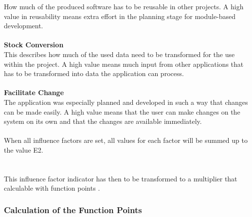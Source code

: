 How much of the produced software has to be reusable in other projects. A high value in reusability means extra effort in the planning stage for module-based development.\\
\\
\textbf{Stock Conversion}\\
This describes how much of the used data need to be transformed for the use within the project. A high value means much input from other applications that has to be transformed into data the application can process.\\
\\
\textbf{Facilitate Change}\\
The application was especially planned and developed in such a way that changes can be made easily. A high value means that the user can make changes on the system on its own and that the changes are available immediately.
\\
\\
When all influence factors are set, all values for each factor will be summed up to the value E2.\\ 

\\
\\
This influence factor indicator has then to be transformed to a multiplier that calculable with function points \cite{Softwaremanagement}\cite{fpafundamentals}.  \\

\subsubsection{Calculation of the Function Points}

